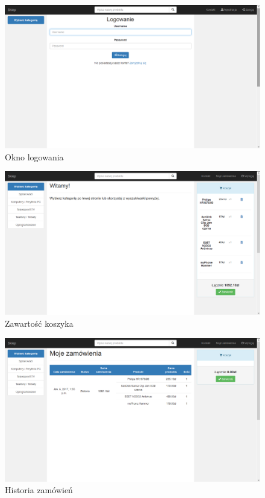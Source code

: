 \documentclass[10pt,a4paper]{article}
\begin{document}
\begin{landscape}
\begin{figure}[H]
   \end{figure}
   \newpage
   \begin{figure}[H]
   \caption{Okno logowania}
   \centering
   \includegraphics[scale=0.6]{login}
   \end{figure}
   \newpage
   \begin{figure}[H]
   \caption{Zawartość koszyka}
   \centering
   \includegraphics[scale=0.6]{koszyk}
   \end{figure}
     \newpage
   \begin{figure}[H]
   \caption{Historia zamówień}
   \centering
   \includegraphics[scale=0.6]{orders}
   \end{figure}
   \end{landscape}
   
\end{document}
